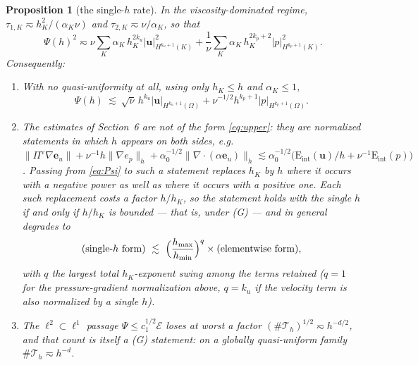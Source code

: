 \documentclass[11pt,a4paper]{article}
\newtheorem{proposition}[lemma]{Proposition}
\theoremstyle{definition}
\newcommand{\Th}{\mathcal{T}_h}
\newcommand{\bu}{\boldsymbol{u}}
\begin{document}
\begin{proposition}[the single-$h$ rate]\label{prop:rate}
In the viscosity-dominated regime, $\tau_{1,K}\eqsim h_K^2/(\alpha_K\nu)$ and
$\tau_{2,K}\eqsim\nu/\alpha_K$, so that
\begin{equation}\label{eq:Psiexpanded}
  \Psi(h)^2\eqsim
  \nu\sum_K\alpha_K\,h_K^{2k_u}\lvert\bu\rvert^2_{H^{k_u+1}(K)}
  +\frac1\nu\sum_K\alpha_K\,h_K^{2k_p+2}\lvert p\rvert^2_{H^{k_p+1}(K)} .
\end{equation}
Consequently:
\begin{enumerate}
\item[(i)] With no quasi-uniformity at all, using only $h_K\le h$ and $\alpha_K\le1$,
\begin{equation}\label{eq:upper}
  \Psi(h)\ \lesssim\ \sqrt\nu\,h^{k_u}\lvert\bu\rvert_{H^{k_u+1}(\Omega)}
  +\nu^{-1/2}h^{k_p+1}\lvert p\rvert_{H^{k_p+1}(\Omega)} .
\end{equation}
\item[(ii)] The estimates of Section~6 are \emph{not} of the form \eqref{eq:upper}: they are
normalized statements in which $h$ appears on \emph{both} sides, e.g.
$\lVert\Pi^{\mathrm v}\nabla\boldsymbol{e}_u\rVert+\nu^{-1}h\lVert\nabla e_p\rVert_h
+\alpha_0^{-1/2}\lVert\nabla\!\cdot(\alpha\boldsymbol{e}_u)\rVert_h
\lesssim\alpha_0^{-1/2}\bigl(\mathrm{E}_{\mathrm{int}}(\bu)/h+\nu^{-1}\mathrm{E}_{\mathrm{int}}(p)\bigr)$.
Passing from \eqref{eq:Psi} to such a statement replaces $h_K$ by $h$ where it occurs with a
\emph{negative} power as well as where it occurs with a positive one. Each such replacement costs a
factor $h/h_K$, so the statement holds with the single $h$ if and only if $h/h_K$ is bounded ---
that is, under (G) --- and in general degrades to
\begin{equation}\label{eq:degrade}
  \text{(single-}h\text{ form)}\ \lesssim\
  \Bigl(\frac{h_{\max}}{h_{\min}}\Bigr)^{q}\times\text{(elementwise form)},
\end{equation}
with $q$ the largest total $h_K$-exponent swing among the terms retained ($q=1$ for the
pressure-gradient normalization above, $q=k_u$ if the velocity term is also normalized by a single
$h$).
\item[(iii)] The $\ell^2\subset\ell^1$ passage $\Psi\le c_1^{1/2}\mathcal E$ loses at worst a factor
$(\#\Th)^{1/2}\eqsim h^{-d/2}$, and that count is itself a (G) statement: on a globally
quasi-uniform family $\#\Th\eqsim h^{-d}$.
\end{enumerate}
\end{proposition}
\end{document}
